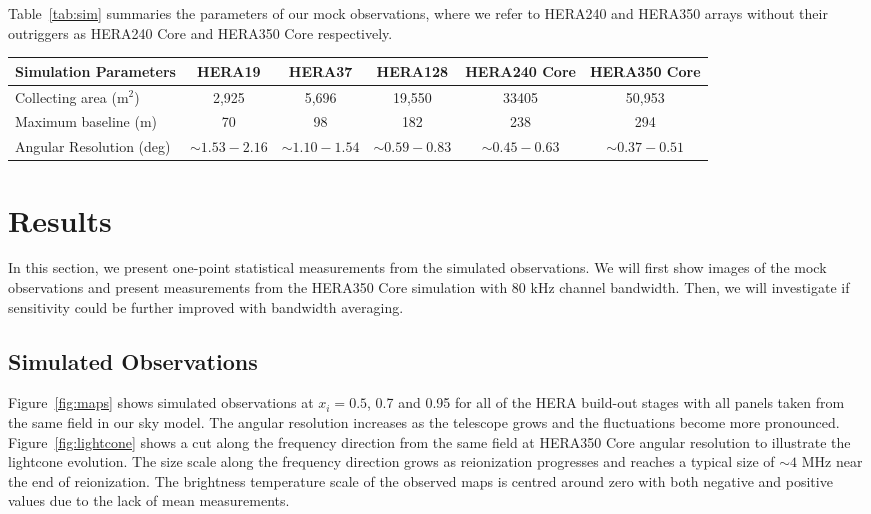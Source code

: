 \documentclass[fleqn,usenatbib]{mnras}
\begin{document}
Table~\ref{tab:sim} summaries the parameters of our mock observations, where we refer to HERA240 and HERA350 arrays without their outriggers as HERA240 Core and HERA350 Core respectively.

\begin{table*}
\begin{center}
\begin{tabular}{l c c c c c}
\hline
Simulation Parameters &HERA19  &HERA37 &HERA128 &HERA240 Core &HERA350 Core \\
\hline
Collecting area (m$^2$)   	&2,925		&5,696     &19,550		&33405		&50,953     \\
Maximum baseline (m)     &70		&98     	&182 	&238	 &294       \\
Angular Resolution (deg) &$\sim1.53-2.16$ 		&$\sim1.10-1.54$ 	&$\sim0.59-0.83$  &$\sim0.45-0.63$ 	&$\sim0.37-0.51$ \\
\hline
\end{tabular}
\caption{\label{tab:sim}Instrument specifications for the HERA build-out stages used in our mock observations. We perform the simulation over$\sim$56 MHz bandwidth, from $\sim$139-195~MHz, with 80~kHz spectral channel bandwidth. Further information on the array configurations can be found in \citet{2017PASP..129d5001D}.}
\end{center}
\end{table*}


\section{Results}
\label{sec:results}
In this section, we present one-point statistical measurements from the simulated observations. We will first show images of the mock observations and present measurements from the HERA350 Core simulation with 80 kHz channel bandwidth. Then, we will investigate if sensitivity could be further improved with bandwidth averaging.

\subsection{Simulated Observations}
Figure~\ref{fig:maps} shows simulated observations at $x_i=0.5$, 0.7 and 0.95 for all of the HERA build-out stages with all panels taken from the same field in our sky model. The angular resolution increases as the telescope grows and the fluctuations become more pronounced. Figure~\ref{fig:lightcone} shows a cut along the frequency direction from the same field at HERA350 Core angular resolution to illustrate the lightcone evolution. The size scale along the frequency direction grows as reionization progresses and reaches a typical size of $\sim4$ MHz near the end of reionization. The brightness temperature scale of the  observed maps is centred around zero with both negative and positive values due to the lack of mean measurements. 
\end{document}
